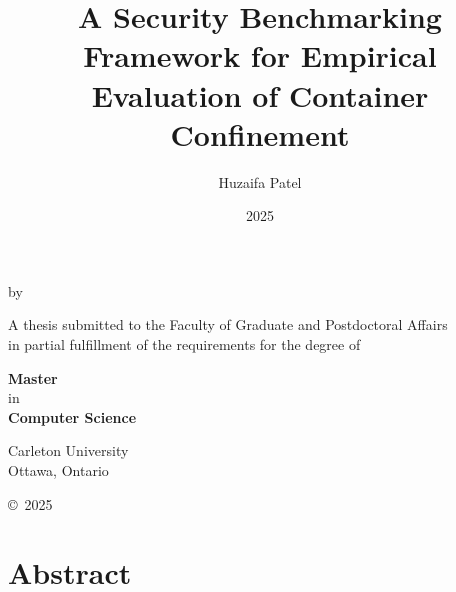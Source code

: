 \documentclass[12pt]{report}
\providecommand{\DIFaddbegin}{} %
\providecommand{\DIFaddend}{} %
\newcommand{\DIFaddincludegraphics}[2][]{{\color{blue}\fbox{\DIFOincludegraphics[#1]{#2}}}} %
\DeclareRobustCommand{\DIFaddbegin}{\DIFOaddbegin \let\includegraphics\DIFaddincludegraphics} %
\DeclareRobustCommand{\DIFaddend}{\DIFOaddend \let\includegraphics\DIFOincludegraphics} %
\begin{document}
\DIFaddbegin 

\DIFaddend \title{A Security Benchmarking Framework for Empirical Evaluation of Container Confinement}
\author{Huzaifa Patel}
\date{2025}

\makeatletter
\begin{titlepage}
     \begin{center}
        \vspace*{3cm} 

        {\LARGE \textbf{\@title} \par} 

        \vspace{0.5cm}

        \vspace{2cm}
        \large{by}
        \vspace{0.5cm}

        {\Large \textbf{\@author}} 

        \vfill

        {\large A thesis submitted to the Faculty of Graduate and Postdoctoral Affairs\\
        in partial fulfillment of the requirements for the degree of}

        \vspace{1cm}

        \large{{\textbf{Master}} \\
        {in} \\
        {\textbf{Computer Science}}}


        \vspace{2cm}

        \large{Carleton University\\
        Ottawa, Ontario}

        \vspace{1.5cm}


        \vfill

        \copyright{}~2025 \@author
    \end{center}
\end{titlepage}
\makeatother \chapter*{Abstract}
\fontsize{12pt}{14pt} \selectfont
\end{document}
